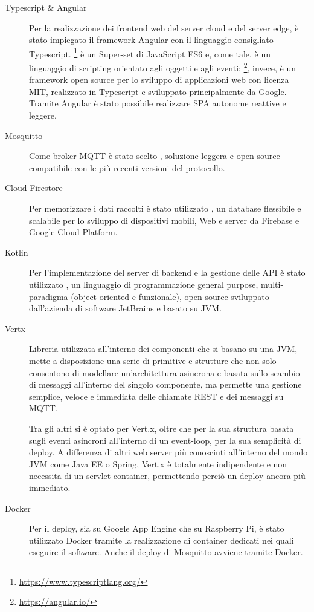 \begin{description}
  \item[Typescript \& Angular]
    Per la realizzazione dei frontend web del server cloud e del server edge, è stato impiegato il framework Angular con il linguaggio consigliato Typescript.
    \footnote{\url{https://www.typescriptlang.org/}} è un Super-set di JavaScript ES6 e, come tale, è un linguaggio di scripting orientato agli oggetti e agli eventi;
    \footnote{\url{https://angular.io/}}, invece, è un framework open source per lo sviluppo di applicazioni web con licenza MIT, realizzato in Typescript e sviluppato principalmente da Google.
    Tramite Angular è stato possibile realizzare SPA autonome reattive e leggere.
  \item[Mosquitto\footnotemark]
    Come broker MQTT è stato scelto , soluzione leggera e open-source compatibile con le più recenti versioni del protocollo.
  \item[Cloud Firestore]
    Per memorizzare i dati raccolti è stato utilizzato , un database flessibile e scalabile per lo sviluppo di dispositivi mobili, Web e server da Firebase e Google Cloud Platform.
  \item[Kotlin\footnotemark]
    Per l'implementazione del server di backend e la gestione delle API è stato utilizzato , un linguaggio di programmazione general purpose, multi-paradigma (object-oriented e funzionale), open source sviluppato dall'azienda di software JetBrains e basato su JVM\@.
  \item[Vertx\footnotemark]
    Libreria utilizzata all’interno dei componenti che si basano su una JVM, mette a disposizione una serie di primitive e strutture che non solo consentono di modellare un'architettura asincrona e basata sullo scambio di messaggi all'interno del singolo componente, ma permette una gestione semplice, veloce e immediata delle chiamate REST e dei messaggi su MQTT\@.

    Tra gli altri si è optato per Vert.x, oltre che per la sua struttura basata sugli eventi asincroni all’interno di un event-loop, per la sua semplicità di deploy.
    A differenza di altri web server più conosciuti all’interno del mondo JVM come Java EE o Spring, Vert.x è totalmente indipendente e non necessita di un servlet container, permettendo perciò un deploy ancora più immediato.
  \item[Docker]
    Per il deploy, sia su Google App Engine che su Raspberry Pi, è stato utilizzato Docker tramite la realizzazione di container dedicati nei quali eseguire il software.
    Anche il deploy di Mosquitto avviene tramite Docker.
\end{description}

